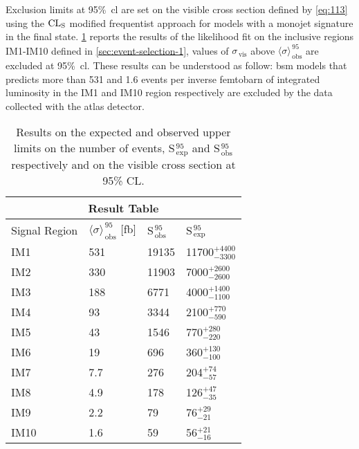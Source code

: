 Exclusion limits at 95\%~\gls{cl} are set on the visible cross section defined
by \cref{eq:113} using the $\mathrm{CL}_\mathrm{S}$ modified frequentist approach for models with
a monojet signature in the final state. \cref{tab:cs_vis_results_2016} reports
the results of the likelihood fit on the inclusive regions IM1-IM10 defined in
\cref{sec:event-selection-1}, values of $\sigma_\mathrm{\, vis}$ above
$\langle \sigma \rangle_\mathrm{\, obs}^{\, 95}$ are excluded at
95\%~\gls{cl}. These results can be understood as follow: \gls{bsm} models that
predicts more than 531 and 1.6 events per inverse femtobarn of integrated
luminosity in the IM1 and IM10 region respectively are excluded by the data
collected with the \gls{atlas} detector.
\begin{table}[!h]
  \centering
  \begin{tabular}{llll}
    \toprule
    \multicolumn{4}{c}{Result Table} \\
    \midrule \midrule
    Signal Region & $\langle \sigma \rangle_\mathrm{\, obs}^{\, 95}$ [fb] & S$_\mathrm{\, obs}^{\, 95}$ & S$_\mathrm{\, exp}^{\, 95}$ \\
    \midrule
    IM1 & 531 & 19135 & 11700$^{+4400}_{-3300}$ \B \\
    IM2 & 330 & 11903 &  7000$^{+2600}_{-2600}$ \T \B \\
    IM3 & 188 & 6771  &  4000$^{+1400}_{-1100}$ \T \B \\
    IM4 & 93  & 3344  &  2100$^{+770}_{-590}$ \T \B \\
    IM5 & 43  & 1546  &   770$^{+280}_{-220}$ \T \B \\
    IM6 & 19  & 696   &   360$^{+130}_{-100}$ \T \B\\
    IM7 & 7.7 & 276   &   204$^{+74}_{-57}$ \T \\
    IM8 & 4.9 & 178   &   126$^{+47}_{-35}$ \T \\
    IM9 & 2.2 & 79    &    76$^{+29}_{-21}$ \T \\
    IM10& 1.6 & 59    &    56$^{+21}_{-16}$ \T \\
    \bottomrule
  \end{tabular}
  \caption{Results on the expected and observed upper limits on the number of
    events, S$_\mathrm{\, exp}^{\, 95}$ and S$_\mathrm{\, obs}^{\, 95}$
    respectively and on the visible cross section at 95\% CL.}
  \label{tab:cs_vis_results_2016}
\end{table}
